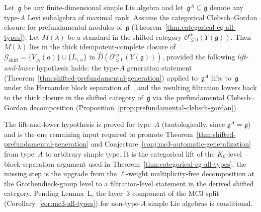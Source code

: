 \begin{conjecture}
\label{conj:rank-independence-step2}
Let~$\mathfrak{g}$ be any finite-dimensional simple Lie algebra and
let~$\mathfrak{g}^A \subseteq \mathfrak{g}$ denote any type-$A$
Levi subalgebra of maximal rank. Assume the categorical
Clebsch--Gordan closure for prefundamental modules of~$\mathfrak{g}$
\textup{(}Theorem~\textup{\ref{thm:categorical-cg-all-types}}\textup{)}.
Let $M(\lambda)$ be a standard in the shifted category
$\mathcal{O}^{\mathrm{sh}}_{\leq 0}(Y(\mathfrak{g}))$. Then
$M(\lambda)$ lies in the thick idempotent-complete closure of
$\mathcal{G}_{\mathrm{shift}} =
\{V_{\omega_i}(a)\} \cup \{L^-_{i,a}\}$ in
$\widehat{D}(\mathcal{O}^{\mathrm{sh}}_{\leq 0}(Y(\mathfrak{g})))$,
provided the following \emph{lift-and-lower} hypothesis holds:
the type-$A$ generation statement
\textup{(}Theorem~\textup{\ref{thm:shifted-prefundamental-generation}}\textup{)}
applied to~$\mathfrak{g}^A$ lifts to~$\mathfrak{g}$ under the
Hernandez block separation of~\cite{HJZ25}, and the resulting
filtration lowers back to the thick closure in the shifted
category of~$\mathfrak{g}$ via the prefundamental
Clebsch--Gordan decomposition
\textup{(}Proposition~\textup{\ref{prop:prefundamental-clebsch-gordan}}\textup{)}.
\end{conjecture}

\begin{remark}
\label{rem:lemma-L-status}
The lift-and-lower hypothesis is proved for type~$A$
\textup{(}tautologically, since $\mathfrak{g}^A = \mathfrak{g}$\textup{)}
and is the one remaining input required to promote
Theorem~\ref{thm:shifted-prefundamental-generation} and
Conjecture~\ref{conj:mc3-automatic-generalization} from type~$A$
to arbitrary simple type. It is the categorical lift of the
$K_0$-level block-separation argument used in
Theorem~\ref{thm:categorical-cg-all-types}; the missing step is
the upgrade from the $\ell$-weight multiplicity-free decomposition
at the Grothendieck-group level to a filtration-level statement
in the derived shifted category. Pending Lemma~L, the layer~3
component of the MC3 split
\textup{(}Corollary~\textup{\ref{cor:mc3-all-types}}\textup{)}
for non-type-$A$ simple Lie algebras is conditional.
\end{remark}

